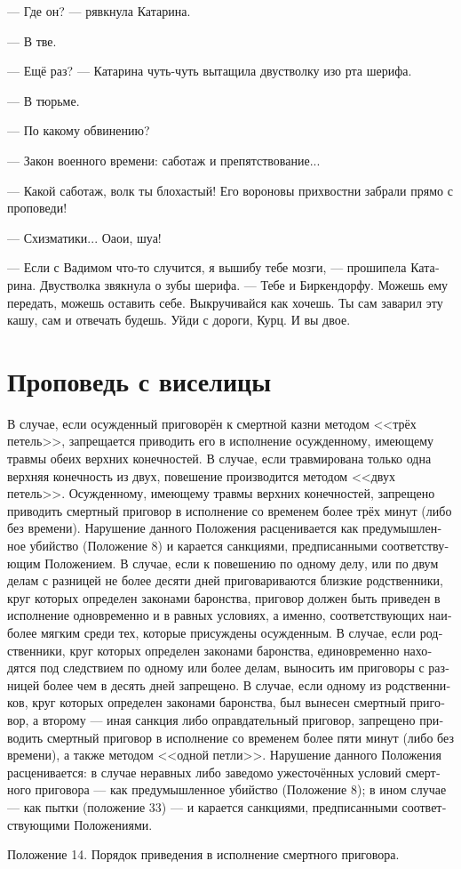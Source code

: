\documentclass[a4paper,12pt,fleqn]{book}\usepackage{cooltooltips}\usepackage{polyglossia}\setdefaultlanguage[babelshorthands=true]{russian}\setotherlanguage{english}\defaultfontfeatures{Ligatures=TeX,Mapping=tex-text} \usepackage{xcolor}\definecolor{lightgray}{HTML}{bbbbbb}\color{lightgray}\newcommand{\ml}[3]{\textenglish{\textcolor{black}{#3}}}
\begin{document}
--- Где он? --- рявкнула Катарина.

--- В тве.

--- Ещё раз? --- Катарина чуть-чуть вытащила двустволку изо рта шерифа.

--- В тюрьме.

--- По какому обвинению?

--- Закон военного времени: саботаж и препятствование...

--- Какой саботаж, волк ты блохастый!
Его вороновы прихвостни забрали прямо с проповеди!

--- Схизматики...
Оаои, шуа!

--- Если с Вадимом что-то случится, я вышибу тебе мозги, --- прошипела Катарина.
Двустволка звякнула о зубы шерифа.
--- Тебе и Биркендорфу.
Можешь ему передать, можешь оставить себе.
Выкручивайся как хочешь.
Ты сам заварил эту кашу, сам и отвечать будешь.
Уйди с дороги, Курц.
И вы двое.

\section{Проповедь с виселицы}

\epigraph{
В случае, если осужденный приговорён к смертной казни методом <<трёх петель>>, запрещается приводить его в исполнение осужденному, имеющему травмы обеих верхних конечностей.
В случае, если травмирована только одна верхняя конечность из двух, повешение производится методом <<двух петель>>.
Осужденному, имеющему травмы верхних конечностей, запрещено приводить смертный приговор в исполнение со временем более трёх минут (либо без времени).
Нарушение данного Положения расценивается как предумышленное убийство (Положение 8) и карается санкциями, предписанными соответствующим Положением.
В случае, если к повешению по одному делу, или по двум делам с разницей не более десяти дней приговариваются близкие родственники, круг которых определен законами баронства, приговор должен быть приведен в исполнение одновременно и в равных условиях, а именно, соответствующих наиболее мягким среди тех, которые присуждены осужденным.
В случае, если родственники, круг которых определен законами баронства, единовременно находятся под следствием по одному или более делам, выносить им приговоры с разницей более чем в десять дней запрещено.
В случае, если одному из родственников, круг которых определен законами баронства, был вынесен смертный приговор, а второму --- иная санкция либо оправдательный приговор, запрещено приводить смертный приговор в исполнение со временем более пяти минут (либо без времени), а также методом <<одной петли>>.
Нарушение данного Положения расценивается: в случае неравных либо заведомо ужесточённых условий смертного приговора --- как предумышленное убийство (Положение 8); в ином случае --- как пытки (положение 33) --- и карается санкциями, предписанными соответствующими Положениями.
}{
Положение 14.
Порядок приведения в исполнение смертного приговора.
}
\end{document}

